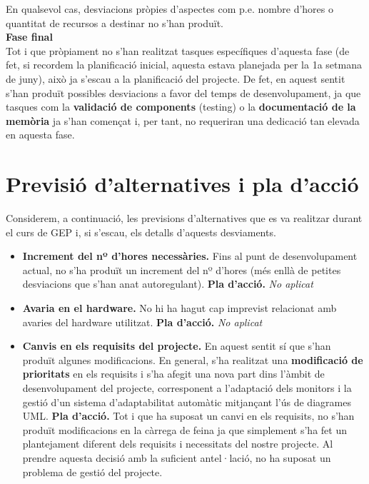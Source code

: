 En qualsevol cas, desviacions pròpies d'aspectes com p.e. nombre d'hores o quantitat de recursos a destinar no s'han produït.\\

\textbf{Fase final}\\

Tot i que pròpiament no s'han realitzat tasques específiques d'aquesta fase (de fet, si recordem la planificació inicial, aquesta estava planejada per la 1a setmana de juny), això ja s'escau a la planificació del projecte. De fet, en aquest sentit s'han produït possibles desviacions a favor del temps de desenvolupament, ja que tasques com la \textbf{validació de components} (testing) o la \textbf{documentació de la memòria} ja s'han començat i, per tant, no requeriran una dedicació tan elevada en aquesta fase.

\section{Previsió d'alternatives i pla d'acció}

Considerem, a continuació, les previsions d'alternatives que es va realitzar durant el curs de GEP i, si s'escau, els detalls d'aquests desviaments.

\begin{itemize}
\item \textbf{Increment del nº d’hores necessàries.} Fins al punt de desenvolupament actual, no s'ha produït un increment del nº d'hores (més enllà de petites desviacions que s'han anat autoregulant).
\subitem \textbf{Pla d’acció.} \textit{No aplicat}
\item \textbf{Avaria en el hardware.} No hi ha hagut cap imprevist relacionat amb avaries del hardware utilitzat.
\subitem \textbf{Pla d’acció.} \textit{No aplicat}
\item \textbf{Canvis en els requisits del projecte.} En aquest sentit sí que s'han produït algunes modificacions. En general, s'ha realitzat una \textbf{modificació de prioritats} en els requisits i s'ha afegit una nova part dins l'àmbit de desenvolupament del projecte, corresponent a l'adaptació dels monitors i la gestió d'un sistema d'adaptabilitat automàtic mitjançant l'ús de diagrames UML. 
\subitem \textbf{Pla d’acció.} Tot i que ha suposat un canvi en els requisits, no s'han produït modificacions en la càrrega de feina ja que simplement s'ha fet un plantejament diferent dels requisits i necessitats del nostre projecte. Al prendre aquesta decisió amb la suficient antel·lació, no ha suposat un problema de gestió del projecte.
\end{itemize}